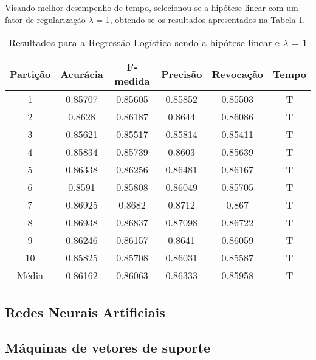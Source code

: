 Visando melhor desempenho de tempo, selecionou-se a hipótese linear com um fator de regularização \(\lambda\)  = 1, obtendo-se os resultados apresentados na Tabela \ref{table:resultadosRL}.


\begin{table}[h]
\centering
\caption{Resultados para a Regressão Logística sendo a hipótese linear e \(\lambda\) = 1}
\vspace{0.2cm}
\begin{tabular}{c|c|c|c|c|c}
Partição & Acurácia & F-medida & Precisão & Revocação & Tempo \\
\hline
1  & 0.85707 & 0.85605 & 0.85852 & 0.85503 & T \\
2  & 0.8628  & 0.86187 & 0.8644  & 0.86086 & T \\
3  & 0.85621 & 0.85517 & 0.85814 & 0.85411 & T \\
4  & 0.85834 & 0.85739 & 0.8603  & 0.85639 & T \\
5  & 0.86338 & 0.86256 & 0.86481 & 0.86167 & T \\
6  & 0.8591  & 0.85808 & 0.86049 & 0.85705 & T \\
7  & 0.86925 & 0.8682  & 0.8712  & 0.867   & T \\
8  & 0.86938 & 0.86837 & 0.87098 & 0.86722 & T \\
9  & 0.86246 & 0.86157 & 0.8641  & 0.86059 & T \\
10 & 0.85825 & 0.85708 & 0.86031 & 0.85587 & T \\
\hline
Média & 0.86162 & 0.86063 & 0.86333 & 0.85958 & T 

\end{tabular} 
\label{table:resultadosRL}
\end{table}

\subsection{Redes Neurais Artificiais}

\subsection{Máquinas de vetores de suporte}

